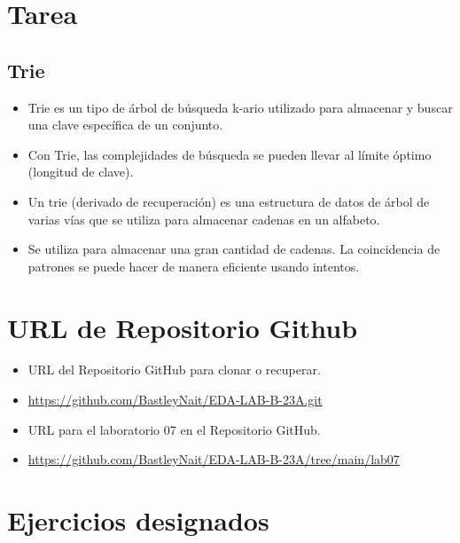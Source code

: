 \documentclass{article}
\begin{document}
	\section{Tarea}
	\subsection{Trie}
	\begin{itemize}
		
	\item Trie es un tipo de árbol de búsqueda k-ario utilizado para almacenar y buscar una clave específica de un conjunto.

	\item Con Trie, las complejidades de búsqueda se pueden llevar al límite óptimo (longitud de clave).

	\item Un trie (derivado de recuperación) es una estructura de datos de árbol de varias vías que se utiliza para almacenar cadenas en un alfabeto.

	\item Se utiliza para almacenar una gran cantidad de cadenas. La coincidencia de patrones se puede hacer de manera eficiente usando intentos.

	\end{itemize}	
		

	\section{URL de Repositorio Github}
	\begin{itemize}
		\item URL del Repositorio GitHub para clonar o recuperar.
		\item \url{https://github.com/BastleyNait/EDA-LAB-B-23A.git}
		\item URL para el laboratorio 07 en el Repositorio GitHub.
		\item \url{https://github.com/BastleyNait/EDA-LAB-B-23A/tree/main/lab07}
	\end{itemize}
	
	\section{Ejercicios designados}
\end{document}
